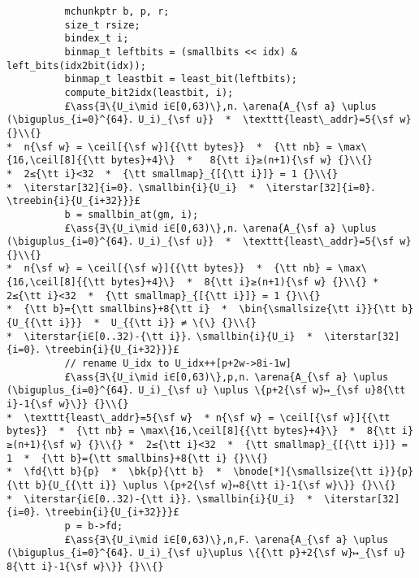 \documentclass[10pt,twoside]{report}
\makeatletter
\newcommand{\ml}[2][t]{\mbox{\mdseries\begin{tabular}[#1]{@{}L@{}}#2\end{tabular}}}
\newcommand{\ass}[1]{\ensuremath{{\color{blue}\left\{\ml[c]{#1}\right\}}}}
\renewcommand{\ceil}[2][]{\left\lceil{#2}\right\rceil_{#1}}
\newcommand{\iterstar}[2][]{\text{\LARGE $*$}^{#1}_{#2}}
\makeatother
\begin{document}
\begin{lstlisting}
          mchunkptr b, p, r;
          size_t rsize;
          bindex_t i;
          binmap_t leftbits = (smallbits << idx) & left_bits(idx2bit(idx));
          binmap_t leastbit = least_bit(leftbits);
          compute_bit2idx(leastbit, i);
          £\ass{∃\{U_i\mid i∈[0,63)\},n．\arena{A_{\sf a} \uplus (\biguplus_{i=0}^{64}．U_i)_{\sf u}}  *  \texttt{least\_addr}=5{\sf w} {}\\{}
*  n{\sf w} = \ceil[{\sf w}]{{\tt bytes}}  *  {\tt nb} = \max\{16,\ceil[8]{{\tt bytes}+4}\}  *   8{\tt i}≥(n+1){\sf w} {}\\{}
*  2≤{\tt i}<32  *  {\tt smallmap}_{[{\tt i}]} = 1 {}\\{}
*  \iterstar[32]{i=0}．\smallbin{i}{U_i}  *  \iterstar[32]{i=0}．\treebin{i}{U_{i+32}}}£
          b = smallbin_at(gm, i);
          £\ass{∃\{U_i\mid i∈[0,63)\},n．\arena{A_{\sf a} \uplus (\biguplus_{i=0}^{64}．U_i)_{\sf u}}  *  \texttt{least\_addr}=5{\sf w} {}\\{}
*  n{\sf w} = \ceil[{\sf w}]{{\tt bytes}}  *  {\tt nb} = \max\{16,\ceil[8]{{\tt bytes}+4}\}  *  8{\tt i}≥(n+1){\sf w} {}\\{} *  2≤{\tt i}<32  *  {\tt smallmap}_{[{\tt i}]} = 1 {}\\{}
*  {\tt b}={\tt smallbins}+8{\tt i}  *  \bin{\smallsize{\tt i}}{\tt b}{U_{{\tt i}}}  *  U_{{\tt i}} ≠ \{\} {}\\{}
*  \iterstar{i∈[0..32)-{\tt i}}．\smallbin{i}{U_i}  *  \iterstar[32]{i=0}．\treebin{i}{U_{i+32}}}£
          // rename U_idx to U_idx++[p+2w->8i-1w]
          £\ass{∃\{U_i\mid i∈[0,63)\},p,n．\arena{A_{\sf a} \uplus (\biguplus_{i=0}^{64}．U_i)_{\sf u} \uplus \{p+2{\sf w}↦_{\sf u}8{\tt i}-1{\sf w}\}} {}\\{}
*  \texttt{least\_addr}=5{\sf w}  * n{\sf w} = \ceil[{\sf w}]{{\tt bytes}}  *  {\tt nb} = \max\{16,\ceil[8]{{\tt bytes}+4}\}  *  8{\tt i}≥(n+1){\sf w} {}\\{} *  2≤{\tt i}<32  *  {\tt smallmap}_{[{\tt i}]} = 1  *  {\tt b}={\tt smallbins}+8{\tt i} {}\\{}
*  \fd{\tt b}{p}  *  \bk{p}{\tt b}  *  \bnode[*]{\smallsize{\tt i}}{p}{\tt b}{U_{{\tt i}} \uplus \{p+2{\sf w}↦8{\tt i}-1{\sf w}\}} {}\\{}
*  \iterstar{i∈[0..32)-{\tt i}}．\smallbin{i}{U_i}  *  \iterstar[32]{i=0}．\treebin{i}{U_{i+32}}}£
          p = b->fd;
          £\ass{∃\{U_i\mid i∈[0,63)\},n,F．\arena{A_{\sf a} \uplus (\biguplus_{i=0}^{64}．U_i)_{\sf u}\uplus \{{\tt p}+2{\sf w}↦_{\sf u} 8{\tt i}-1{\sf w}\}} {}\\{} 

\end{lstlisting}
\end{document}
